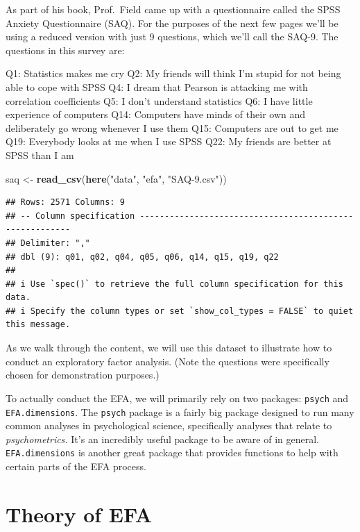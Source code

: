 \documentclass[
]{book}
\newenvironment{Shaded}{\begin{snugshade}}{\end{snugshade}}
\newcommand{\FunctionTok}[1]{\textcolor[rgb]{0.13,0.29,0.53}{\textbf{#1}}}
\newcommand{\NormalTok}[1]{#1}
\newcommand{\OtherTok}[1]{\textcolor[rgb]{0.56,0.35,0.01}{#1}}
\newcommand{\StringTok}[1]{\textcolor[rgb]{0.31,0.60,0.02}{#1}}
\begin{document}
As part of his book, Prof.~Field came up with a questionnaire called the SPSS Anxiety Questionnaire (SAQ). For the purposes of the next few pages we'll be using a reduced version with just 9 questions, which we'll call the SAQ-9. The questions in this survey are:

Q1: Statistics makes me cry
Q2: My friends will think I'm stupid for not being able to cope with SPSS
Q4: I dream that Pearson is attacking me with correlation coefficients
Q5: I don't understand statistics
Q6: I have little experience of computers
Q14: Computers have minds of their own and deliberately go wrong whenever I use them
Q15: Computers are out to get me
Q19: Everybody looks at me when I use SPSS
Q22: My friends are better at SPSS than I am

\begin{Shaded}
\begin{Highlighting}[]
\NormalTok{saq }\OtherTok{\textless{}{-}} \FunctionTok{read\_csv}\NormalTok{(}\FunctionTok{here}\NormalTok{(}\StringTok{"data"}\NormalTok{, }\StringTok{"efa"}\NormalTok{, }\StringTok{"SAQ{-}9.csv"}\NormalTok{))}
\end{Highlighting}
\end{Shaded}

\begin{verbatim}
## Rows: 2571 Columns: 9
## -- Column specification --------------------------------------------------------
## Delimiter: ","
## dbl (9): q01, q02, q04, q05, q06, q14, q15, q19, q22
## 
## i Use `spec()` to retrieve the full column specification for this data.
## i Specify the column types or set `show_col_types = FALSE` to quiet this message.
\end{verbatim}

As we walk through the content, we will use this dataset to illustrate how to conduct an exploratory factor analysis. (Note the questions were specifically chosen for demonstration purposes.)

To actually conduct the EFA, we will primarily rely on two packages: \texttt{psych} and \texttt{EFA.dimensions}. The \texttt{psych} package is a fairly big package designed to run many common analyses in psychological science, specifically analyses that relate to \emph{psychometrics.} It's an incredibly useful package to be aware of in general. \texttt{EFA.dimensions} is another great package that provides functions to help with certain parts of the EFA process.

\hypertarget{theory-of-efa}{%
\section{Theory of EFA}\label{theory-of-efa}}
\end{document}
